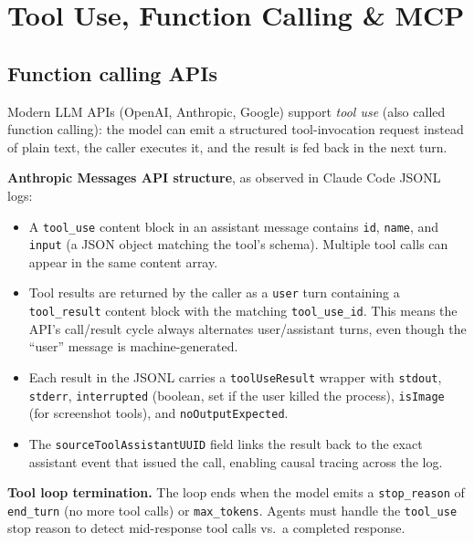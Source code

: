 
\section{Tool Use, Function Calling \& MCP}

\subsection{Function calling APIs}

Modern LLM APIs (OpenAI, Anthropic, Google) support \emph{tool use} (also called
function calling): the model can emit a structured tool-invocation request instead of
plain text, the caller executes it, and the result is fed back in the next turn.

\textbf{Anthropic Messages API structure}, as observed in Claude Code JSONL logs:

\begin{itemize}
  \item A \texttt{tool\_use} content block in an assistant message contains
    \texttt{id}, \texttt{name}, and \texttt{input} (a JSON object matching the tool's
    schema). Multiple tool calls can appear in the same content array.

  \item Tool results are returned by the caller as a \texttt{user} turn containing a
    \texttt{tool\_result} content block with the matching \texttt{tool\_use\_id}. This
    means the API's call/result cycle always alternates user/assistant turns, even though
    the ``user'' message is machine-generated.

  \item Each result in the JSONL carries a \texttt{toolUseResult} wrapper with
    \texttt{stdout}, \texttt{stderr}, \texttt{interrupted} (boolean, set if the user
    killed the process), \texttt{isImage} (for screenshot tools), and
    \texttt{noOutputExpected}.

  \item The \texttt{sourceToolAssistantUUID} field links the result back to the exact
    assistant event that issued the call, enabling causal tracing across the log.
\end{itemize}

\textbf{Tool loop termination.} The loop ends when the model emits a
\texttt{stop\_reason} of \texttt{end\_turn} (no more tool calls) or
\texttt{max\_tokens}. Agents must handle the \texttt{tool\_use} stop reason to detect
mid-response tool calls vs.\ a completed response.

